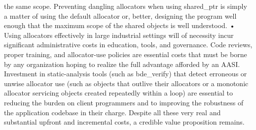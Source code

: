 the same scope. Preventing dangling allocators when using shared_ptr is
simply a matter of using the default allocator or, better, designing the program
well enough that the maximum scope of the shared objects is well understood.
• Using allocators effectively in large industrial settings will of necessity incur
significant administrative costs in education, tools, and governance. Code
reviews, proper training, and allocator-use policies are essential costs that
must be borne by any organization hoping to realize the full advantage
afforded by an AASI. Investment in static-analysis tools (such as bde_verify)
that detect erroneous or unwise allocator use (such as objects that outlive
their allocators or a monotonic allocator servicing objects created repeatedly
within a loop) are essential to reducing the burden on client programmers and
to improving the robustness of the application codebase in their charge.
Despite all these very real and substantial upfront and incremental costs, a credible
value proposition remains.


